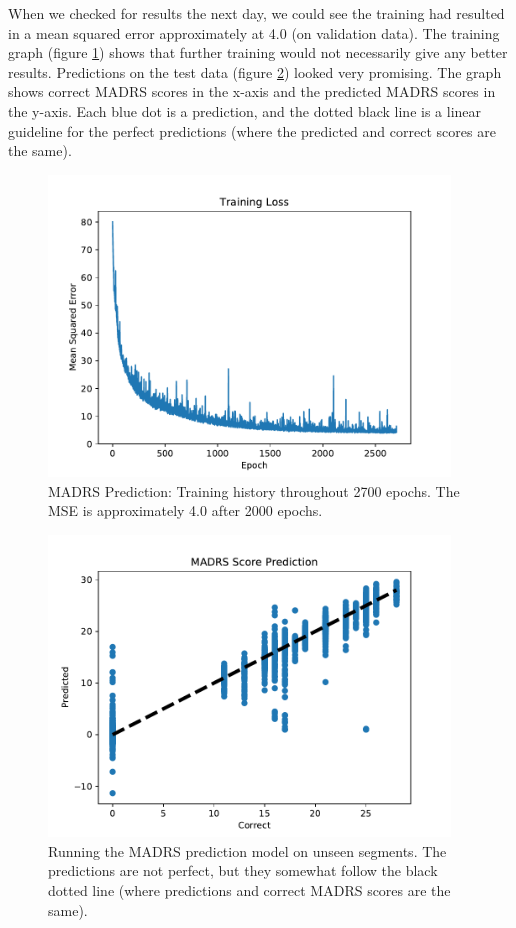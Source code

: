 When we checked for results the next day, we could see the training had resulted in a mean squared error approximately at 4.0 (on validation data). The training graph (figure \ref{figure:madrs_prediction_history}) shows that further training would not necessarily give any better results. Predictions on the test data (figure \ref{figure:madrs_prediction_testset}) looked very promising. The graph shows correct MADRS scores in the x-axis and the predicted MADRS scores in the y-axis. Each blue dot is a prediction, and the dotted black line is a linear guideline for the perfect predictions (where the predicted and correct scores are the same). 

\begin{figure}
\begin{center}
      \includegraphics[height=8cm]{img/madrs_prediction/train_history.pdf}
      \caption{MADRS Prediction: Training history throughout 2700 epochs. The MSE is approximately 4.0 after 2000 epochs.}
      \label{figure:madrs_prediction_history}
\end{center}
\end{figure}

\begin{figure}
\begin{center}
      \includegraphics[height=8cm]{img/madrs_prediction/predictions.pdf}
      \caption{Running the MADRS prediction model on unseen segments. The predictions are not perfect, but they somewhat follow the black dotted line (where predictions and correct MADRS scores are the same).}
      \label{figure:madrs_prediction_testset}
\end{center}
\end{figure}
\newpage

